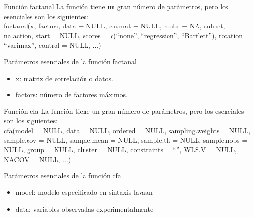 \documentclass[10pt]{beamer}
\begin{document}
\begin{frame}[fragile]{Función factanal}
La función tiene un gran número de parámetros, pero los esenciales son los siguientes:\\
\vspace{10px}
factanal(x, factors, data = NULL, covmat = NULL, n.obs = NA,
subset, na.action, start = NULL,
scores = c(``none'', ``regression'', ``Bartlett''),
rotation = ``varimax'', control = NULL, ...)
\vspace{10px}
\begin{block}{Parámetros esenciales de la función factanal}
	\begin{itemize}
		\item x: matriz de correlación o datos.
		\item factors: número de factores máximos.
	\end{itemize}
\end{block}
\end{frame}

\begin{frame}[fragile]{Función cfa}
La función tiene un gran número de parámetros, pero los esenciales son los siguientes:\\
\vspace{10px}
cfa(model = NULL, data = NULL, ordered = NULL, sampling.weights = NULL,
sample.cov = NULL, sample.mean = NULL, sample.th = NULL,
sample.nobs = NULL, group = NULL, cluster = NULL,
constraints = ``'', WLS.V = NULL, NACOV = NULL,
...)
\vspace{10px}
\begin{block}{Parámetros esenciales de la función cfa}
	\begin{itemize}
		\item model: modelo especificado en sintaxis lavaan
		\item data: variables observadas experimentalmente
	\end{itemize}
\end{block}
\end{frame}
\end{document}
